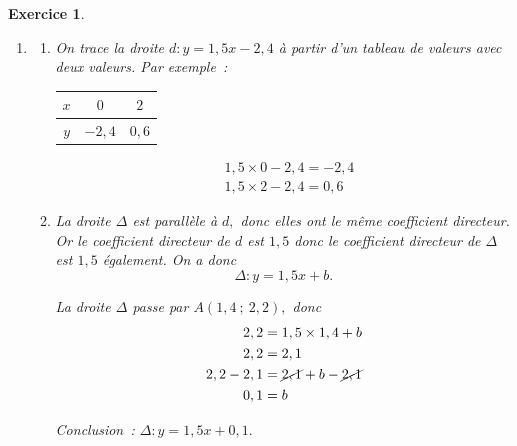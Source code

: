 \documentclass[10pt]{article}
\newtheorem{exo}{Exercice}
\begin{document}
\begin{exo}

\begin{enumerate}
\item \begin{enumerate}
\item
On trace la droite $d:y=1,5x-2,4$ à partir d'un tableau de valeurs avec deux valeurs. Par exemple~:

\setlength{\columnseprule}{1pt}

\begin{multicols}{2}
\begin{center}
\begin{tabular}{|c|c|c|}\hline
$x$&$0$&$2$\\ \hline
$y$&$-2,4$&$0,6$\\ \hline
\end{tabular}
\end{center}
\columnbreak
\begin{align*}
&1,5\times 0-2,4=-2,4\\
&1,5\times 2-2,4=0,6\end{align*}
\end{multicols}

\item La droite $\Delta$ est parallèle à $d,$ donc elles ont le même coefficient directeur. Or le coefficient directeur de $d$ est $1,5$ donc le coefficient directeur de $\Delta$ est $1,5$ également. On a donc
\[\Delta:y=1,5x+b.\]
\medskip

La droite $\Delta$ passe par $A(1,4~;~2,2),$ donc
\begin{align*}2,2&=1,5\times 1,4+b\\
2,2&=2,1\\
2,2-2,1&=\cancel{2,1}+b-\cancel{2,1}\\
0,1&=b
\end{align*}

Conclusion~: $\Delta:y=1,5x+0,1.$

\end{enumerate}



\end{enumerate}
\end{exo}
\end{document}
